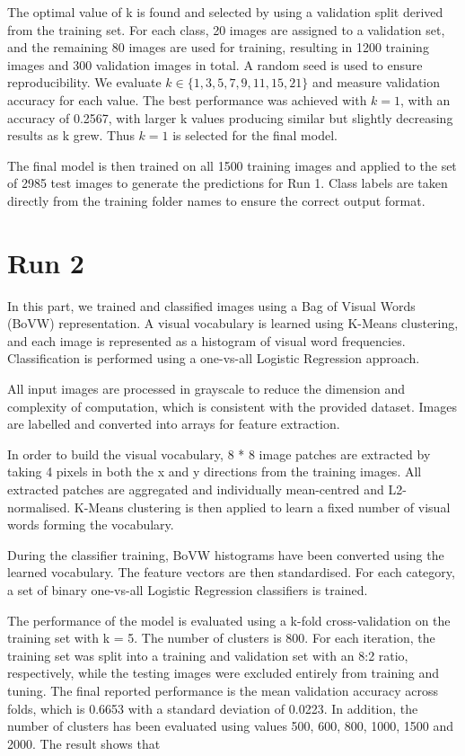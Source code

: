 \documentclass[10pt,twocolumn,letterpaper]{article}
\begin{document}
The optimal value of k is found and selected by using a validation split derived from the training set. For each class, 20 images are assigned to a validation set, and the remaining 80 images are used for training, resulting in 1200 training images and 300 validation images in total. A random seed is used to ensure reproducibility. We evaluate $k \in \{1,3,5,7,9,11,15,21\}$ and measure validation accuracy for each value. The best performance was achieved with $k=1$, with an accuracy of 0.2567, with larger k values producing similar but slightly decreasing results as k grew. Thus $k=1$ is selected for the final model.

The final model is then trained on all 1500 training images and applied to the set of 2985 test images to generate the predictions for Run 1. Class labels are taken directly from the training folder names to ensure the correct output format.


\section{Run 2}
In this part, we trained and classified images using a Bag of Visual Words (BoVW) representation. A visual vocabulary is learned using K-Means clustering, and each image is represented as a histogram of visual word frequencies. Classification is performed using a one-vs-all Logistic Regression approach.

All input images are processed in grayscale to reduce the dimension and complexity of computation, which is consistent with the provided dataset. Images are labelled  and converted into arrays for feature extraction.

In order to build the visual vocabulary, 8 * 8 image patches are extracted by taking 4 pixels in both the x and y directions from the training images. All extracted patches are aggregated and individually mean-centred and L2-normalised. K-Means clustering is then applied to learn a fixed number of visual words forming the vocabulary.

During the classifier training, BoVW histograms have been converted using the learned vocabulary. The feature vectors are then standardised. For each category, a set of binary one-vs-all Logistic Regression classifiers is trained.

The performance of the model is evaluated using a k-fold cross-validation on the training set with k = 5. The number of clusters is 800. For each iteration, the training set was split into a training and validation set with an 8:2 ratio, respectively, while the testing images were excluded entirely from training and tuning. The final reported performance is the mean validation accuracy across folds, which is 0.6653 with a standard deviation of 0.0223. In addition, the number of clusters has been evaluated using values 500, 600, 800, 1000, 1500 and 2000. The result shows that
\end{document}
